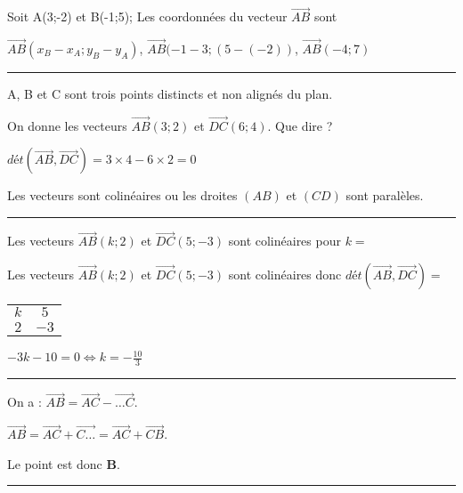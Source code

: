 \documentclass[20pt]{article}
\begin{document}
Soit A(3;-2) et B(-1;5); Les coordonnées du vecteur $\overrightarrow{AB}$ sont

\vspace{0.4cm}

$\overrightarrow{AB}(x_B-x_A;y_B-y_A)$, $\overrightarrow{AB}(-1-3;(5-(-2))$, $\overrightarrow{AB}(-4;7)$

\vspace{1cm}
\hrule 
\vspace{0.4cm}

A, B et C sont trois points distincts et non alignés du plan.

On donne les vecteurs $\overrightarrow{AB}(3;2)$ et $\overrightarrow{DC}(6;4)$. Que dire ? 
\vspace{0.4cm}

$dét\left(\overrightarrow{AB},\overrightarrow{DC}\right)= 3 \times 4 - 6 \times 2  =0$

Les vecteurs sont colinéaires ou les droites $(AB)$ et $(CD)$ sont paralèles.

\vspace{1cm}
\hrule 
\vspace{0.4cm} 

Les vecteurs $\overrightarrow{AB}(k;2)$ et $\overrightarrow{DC}(5;-3)$ sont colinéaires pour $k=$

\vspace{0.4cm}

Les vecteurs $\overrightarrow{AB}(k;2)$ et $\overrightarrow{DC}(5;-3)$ sont colinéaires donc 
$dét(\overrightarrow{AB},\overrightarrow{DC})=$ \begin{tabular}{|c c|}
$k$ & $5$ \\ 
$2$ & $-3$ \\
\end{tabular} $ -3k-10 =0 \Longleftrightarrow  k = -\frac{10}{3} $

\vspace{1cm}
\hrule 
\vspace{0.4cm}

On a : 
$\overrightarrow{AB}= \overrightarrow{AC} - \overrightarrow{\ldots C}$.

$\overrightarrow{AB}= \overrightarrow{AC} + \overrightarrow{ C\ldots}= \overrightarrow{AC} + \overrightarrow{ CB}$.

Le point est donc \textbf{B}.

 


\vspace{1cm}
\hrule 
\vspace{0.4cm}
\end{document}
